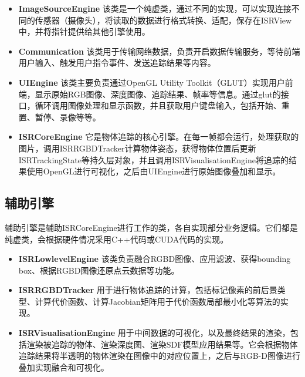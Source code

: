 \begin{itemize}
    \item \textbf{ImageSourceEngine}
该类是一个纯虚类，通过不同的实现，可以实现连接不同的传感器（摄像头），将读取的数据进行格式转换、适配，保存在ISRView中，并将指针提供给其他引擎使用。
    
    \item \textbf{Communication}
该类用于传输网络数据，负责开启数据传输服务，等待前端用户输入、触发用户指令事件、发送追踪结果等内容。
    
    \item \textbf{UIEngine}
该类主要负责通过OpenGL Utility Toolkit（GLUT）实现用户前端，显示原始RGB图像、深度图像、追踪结果、帧率等信息。通过glut的接口，循环调用图像处理和显示函数，并且获取用户键盘输入，包括开始、重置、暂停、录像等等。

    \item \textbf{ISRCoreEngine}
它是物体追踪的核心引擎。在每一帧都会运行，处理获取的图片，调用ISRRGBDTracker计算物体姿态，获得物体位置后更新ISRTrackingState等持久层对象，并且调用ISRVisualisationEngine将追踪的结果使用OpenGL进行可视化，之后由UIEngine进行原始图像叠加和显示。

\end{itemize}

\subsection{辅助引擎}

辅助引擎是辅助ISRCoreEngine进行工作的类，各自实现部分业务逻辑。它们都是纯虚类，会根据硬件情况采用C++代码或CUDA\cite{CUDARef}代码的实现。

\begin{itemize}
    \item \textbf{ISRLowlevelEngine}
该类负责融合RGBD图像、应用滤波、获得bounding box、根据RGBD图像还原点云数据等功能。
    
    \item \textbf{ISRRGBDTracker}
用于进行物体追踪的计算，包括标记像素的前后景类型、计算代价函数、计算Jacobian矩阵用于代价函数局部最小化等算法的实现。
    
    \item \textbf{ISRVisualisationEngine}
用于中间数据的可视化，以及最终结果的渲染，包括渲染被追踪的物体、渲染深度图、渲染SDF模型应用结果等。它会根据物体追踪结果将半透明的物体渲染在图像中的对应位置上，之后与RGB-D图像进行叠加实现融合和可视化。

\end{itemize}

